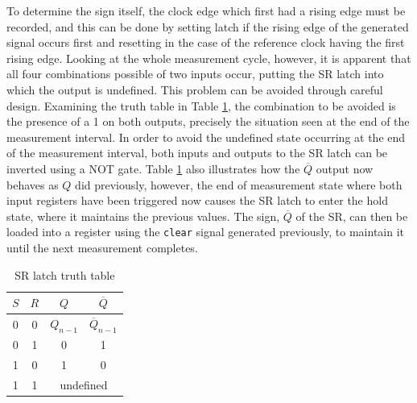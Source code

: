 To determine the sign itself, the clock edge which first had a rising edge must be recorded, and this can be done by setting  latch if the rising edge of the generated signal occurs first and resetting in the case of the reference clock having the first rising edge. Looking at the whole measurement cycle, however, it is apparent that all four combinations possible of two inputs occur, putting the \ac{SR} latch into which the output is undefined. This problem can be avoided through careful design. Examining the truth table in Table \ref{table:sr_tt}, the combination to be avoided is the presence of a 1 on both outputs, precisely the situation seen at the end of the measurement interval. In order to avoid the undefined state occurring at the end of the measurement interval, both inputs and outputs to the \ac{SR} latch can be inverted using a NOT gate. Table \ref{table:sr_tt} also illustrates how the $\overline{Q}$ output now behaves as $Q$ did previously, however, the end of measurement state where both input registers have been triggered now causes the \ac{SR} latch to enter the hold state, where it maintains the previous values. The sign, $\overline{Q}$ of the \ac{SR}, can then be loaded into a register using the \texttt{clear} signal generated previously, to maintain it until the next measurement completes.
\begin{table}[ht]
	\begin{center}
		\begin{tabular}{cc|cc}           
			$S$&$R$&$Q$&$\overline{Q}$\\
			\hline
			0&0&$Q_{n-1}$&$\overline{Q}_{n-1}$\T\\
			0&1&0&1\T\\
			1&0&1&0\T\\
			1&1&\multicolumn{2}{c}{undefined}\T\\					
		\end{tabular}
		\caption{SR latch truth table}
		\label{table:sr_tt}
	\end{center}
\end{table}

